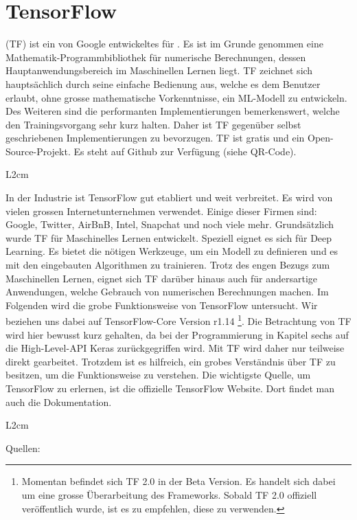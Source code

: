 \section{TensorFlow}\label{sec:tensorflow}
 (TF) ist ein von Google entwickeltes  für
. Es ist im Grunde genommen eine
Mathematik-Programmbibliothek für numerische Berechnungen, dessen Hauptanwendungsbereich im Maschinellen Lernen
liegt. TF zeichnet sich hauptsächlich durch seine einfache Bedienung aus, welche
es dem Benutzer erlaubt, ohne grosse mathematische Vorkenntnisse, ein ML-Modell
zu entwickeln. Des Weiteren sind die performanten
Implementierungen bemerkenswert, welche den Trainingsvorgang sehr kurz halten.
Daher ist TF gegenüber selbst geschriebenen Implementierungen zu bevorzugen.
TF ist gratis und ein Open-Source-Projekt. Es steht auf Github zur Verfügung
(siehe QR-Code).
\begin{wrapfigure}{L}{2cm}
\end{wrapfigure}
In der Industrie ist TensorFlow gut etabliert und weit verbreitet. Es wird von
vielen grossen Internetunternehmen verwendet. Einige dieser
Firmen sind: Google, Twitter, AirBnB, Intel, Snapchat und noch viele mehr.
\para{}
Grundsätzlich wurde TF für Maschinelles Lernen entwickelt. Speziell eignet es
sich für Deep Learning. Es bietet die nötigen Werkzeuge, um ein Modell zu
definieren und es mit den eingebauten Algorithmen zu trainieren.
Trotz des engen Bezugs zum Maschinellen Lernen, eignet sich TF darüber hinaus auch für
andersartige Anwendungen, welche Gebrauch von numerischen Berechnungen machen.
\para{}
Im Folgenden wird die grobe Funktionsweise von TensorFlow untersucht. Wir
beziehen uns dabei auf TensorFlow-Core Version r1.14%
\footnote{Momentan befindet sich TF 2.0 in der Beta Version. Es handelt sich
  dabei um eine grosse Überarbeitung des Frameworks. Sobald TF 2.0 offiziell
  veröffentlich wurde, ist es zu empfehlen, diese zu verwenden.}.
Die Betrachtung von TF wird hier bewusst kurz gehalten, da bei der
Programmierung in Kapitel sechs auf die High-Level-API Keras zurückgegriffen
wird. Mit TF wird daher nur teilweise direkt gearbeitet. Trotzdem ist es hilfreich, ein
grobes Verständnis über TF zu besitzen, um die Funktionsweise zu verstehen.
\para{}
Die wichtigste Quelle, um TensorFlow zu erlernen, ist die offizielle TensorFlow
Website. Dort findet man auch die Dokumentation.
\begin{wrapfigure}{L}{2cm}
\end{wrapfigure}
\para{}
Quellen: \cite{book:tensorflow} \cite{net:tf_docs}

